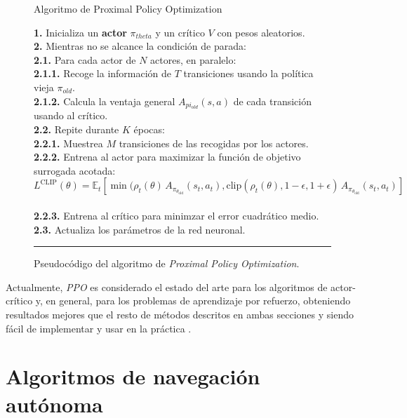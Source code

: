 \begin{itemize}
\begin{figure}[h]
\begin{algorithm}[H]
\caption{Algoritmo de Proximal Policy Optimization}
\textbf{1.} Inicializa un \textbf{actor} $\pi_{theta}$ y un crítico $V$ con pesos aleatorios.\\
\textbf{2.} Mientras no se alcance la condición de parada:\\
\Indp \textbf{2.1.} Para cada actor de $N$ actores, en paralelo:\\
\Indp \textbf{2.1.1.} Recoge la información de $T$ transiciones usando la política vieja $\pi_{old}$.\\
\textbf{2.1.2.} Calcula la ventaja general $A_{pi_{old}}(s, a)$ de cada transición usando al crítico.\\
\Indm \textbf{2.2.} Repite durante $K$ épocas:\\
\Indp \textbf{2.2.1.}  Muestrea $M$ transiciones de las recogidas por los actores.\\
\textbf{2.2.2.} Entrena al actor para maximizar la función de objetivo surrogada acotada:
\[L^\text{CLIP}(\theta) = \mathbb{E}_{t} [ \min (\rho_t(\theta) \, A_{\pi_{\theta_\text{old}}}(s_t, a_t), \text{clip}(\rho_t(\theta) , 1- \epsilon, 1+\epsilon) \,  A_{\pi_{\theta_\text{old}}}(s_t, a_t)]\]\\
\textbf{2.2.3.} Entrena al crítico para minimzar el error cuadrático medio.\\
\Indm \textbf{2.3.} Actualiza los parámetros de la red neuronal.
\end{algorithm}
\hrule
\caption{Pseudocódigo del algoritmo de \textit{Proximal Policy Optimization}.}
\label{alg:chap3-ppo}
\end{figure}

\end{itemize}

Actualmente, \textit{PPO} es considerado el estado del arte para los algoritmos de actor-crítico y, en general, para los problemas de aprendizaje por refuerzo, obteniendo resultados mejores que el resto de métodos descritos en ambas secciones y siendo fácil de implementar y usar en la práctica \cite{vitay_2020}.

\section{Algoritmos de navegación autónoma}

